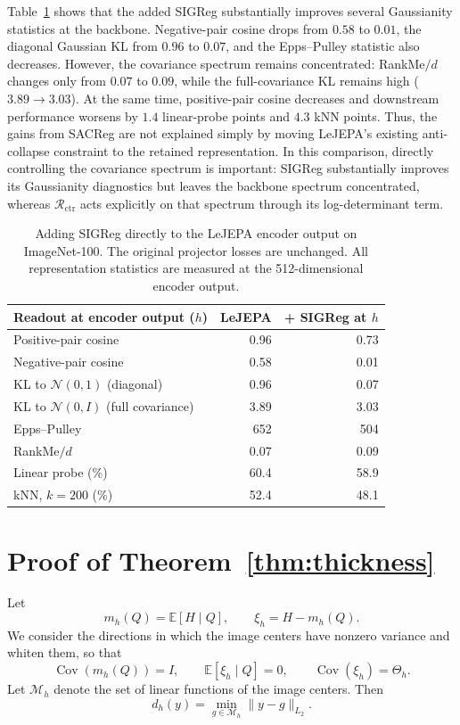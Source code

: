\documentclass{article} %
\theoremstyle{remark}
\begin{document}
Table~\ref{tab:lejepa-sigreg} shows that the added SIGReg substantially improves several Gaussianity statistics at the backbone. Negative-pair cosine drops from $0.58$ to $0.01$, the diagonal Gaussian KL from $0.96$ to $0.07$, and the Epps--Pulley statistic also decreases. However, the covariance spectrum remains concentrated: RankMe$/d$ changes only from $0.07$ to $0.09$, while the full-covariance KL remains high ($3.89\to3.03$). At the same time, positive-pair cosine decreases and downstream performance worsens by $1.4$ linear-probe points and $4.3$ kNN points. Thus, the gains from SACReg are not explained simply by moving LeJEPA's existing anti-collapse constraint to the retained representation. In this comparison, directly controlling the covariance spectrum is important: SIGReg substantially improves its Gaussianity diagnostics but leaves the backbone spectrum concentrated, whereas $\mathcal{R}_{\mathrm{ctr}}$ acts explicitly on that spectrum through its log-determinant term.
\begin{table}[h]
\centering
\small
\begin{tabular}{lrr}
\toprule
Readout at encoder output ($h$) & LeJEPA & + SIGReg at $h$ \\
\midrule
Positive-pair cosine & 0.96 & 0.73 \\
Negative-pair cosine & 0.58 & 0.01 \\
KL to $\mathcal N(0,1)$ (diagonal) & 0.96 & 0.07 \\
KL to $\mathcal N(0,I)$ (full covariance) & 3.89 & 3.03 \\
Epps--Pulley & 652 & 504 \\
RankMe$/d$ & 0.07 & 0.09 \\
Linear probe (\%) & 60.4 & 58.9 \\
kNN, $k=200$ (\%) & 52.4 & 48.1 \\
\bottomrule
\end{tabular}
\caption{Adding SIGReg directly to the LeJEPA encoder output on ImageNet-100. The original projector losses are unchanged. All representation statistics are measured at the 512-dimensional encoder output.}
\label{tab:lejepa-sigreg}
\end{table}


\section{Proof of Theorem~\ref{thm:thickness}}
\label{app:thickness}

Let
\[
m_h(Q)=\mathbb{E}[H\mid Q],
\qquad
\xi_h = H-m_h(Q).
\]
We consider the directions in which the image centers have nonzero variance and whiten them, so that
\[
\operatorname{Cov}(m_h(Q))=I,
\qquad
\mathbb{E}[\xi_h\mid Q]=0,
\qquad
\operatorname{Cov}(\xi_h)=\Theta_h.
\]
Let $\mathcal M_h$ denote the set of linear functions of the image centers. Then
\[
d_h(y)
=
\min_{g\in\mathcal M_h}
\|y-g\|_{L_2}.
\]
\end{document}
